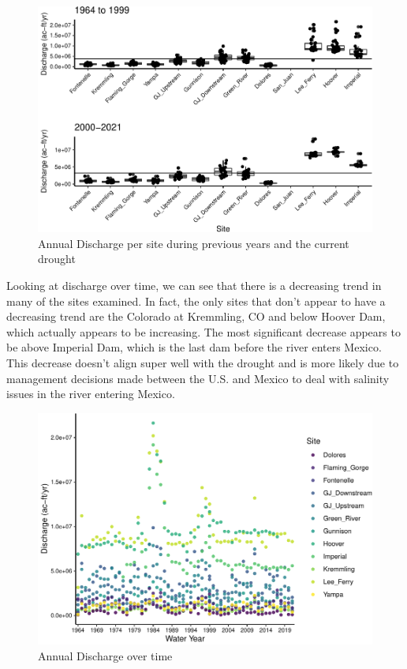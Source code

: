 \documentclass[
  12pt,
]{article}
\begin{document}
\begin{figure}

\includegraphics{WDA_final_project_files/figure-latex/Annual Discharge boxplots-1} \hfill{}

\caption{Annual Discharge per site during previous years and the current drought}\label{fig:Annual Discharge boxplots}
\end{figure}

\newpage

Looking at discharge over time, we can see that there is a decreasing
trend in many of the sites examined. In fact, the only sites that don't
appear to have a decreasing trend are the Colorado at Kremmling, CO and
below Hoover Dam, which actually appears to be increasing. The most
significant decrease appears to be above Imperial Dam, which is the last
dam before the river enters Mexico. This decrease doesn't align super
well with the drought and is more likely due to management decisions
made between the U.S. and Mexico to deal with salinity issues in the
river entering Mexico.

\begin{figure}

\includegraphics{WDA_final_project_files/figure-latex/Discharge Over Time-1} \hfill{}

\caption{Annual Discharge over time}\label{fig:Discharge Over Time}
\end{figure}
\end{document}
